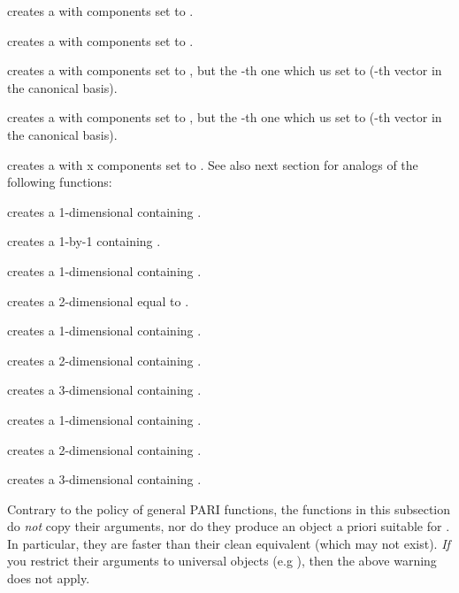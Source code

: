  creates a  with  components set to
.

 creates a  with  components set to
.

 creates a  with  components
set to , but the -th one which us set to 
(-th vector in the canonical basis).

 creates a  with  components
set to , but the -th one which us set to 
(-th vector in the canonical basis).

 creates a  with  x 
components set to .
\smallskip
See also next section for analogs of the following functions:

 creates a 1-dimensional  containing
.

 creates a 1-by-1  containing .

 creates a 1-dimensional  containing
.

 creates a 2-dimensional  equal
to \kbd{[x,y]}.

 creates a 1-dimensional 
containing .

 creates a 2-dimensional 
containing .

 creates a 3-dimensional 
containing .


 creates a 1-dimensional 
containing .

 creates a 2-dimensional 
containing \kbd{[x, y]}.

 creates a 3-dimensional
 containing \kbd{[x, y, z]}.

\label{se:unclean}

Contrary to the policy of general PARI functions, the functions in this
subsection do \emph{not} copy their arguments, nor do they produce an object
a priori suitable for . In particular, they are
faster than their clean equivalent (which may not exist). \emph{If} you
restrict their arguments to universal objects (e.g ),
then the above warning does not apply.

